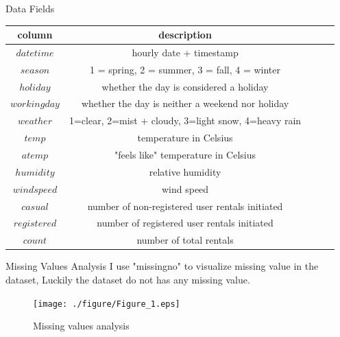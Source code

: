 \documentclass[
 size=14pt,
 paper=smartboard,  %
 mode=present, 		%
 display=slides, 	%
 style=tuliplab,  	%
 pauseslide,
 fleqn,leqno]{powerdot}
\begin{document}
\begin{slide}{Data Fields}
\begin{center}
	\begin{tabular}{c| c c c c }
		\toprule
		\textbf{column} & \textbf{description}  \\
		\midrule
		$datetime$ &  {hourly date + timestamp }\\
		$season$ &  {1 = spring, 2 = summer, 3 = fall, 4 = winter} \\
		$holiday$ &  {whether the day is considered a holiday} \\
		$workingday$ &  {whether the day is neither a weekend nor holiday} \\
		$weather$ &  {1=clear, 2=mist + cloudy, 3=light snow, 4=heavy rain} \\
		$temp$ & {temperature in Celsius} \\
		$atemp$ & {"feels like" temperature in Celsius} \\
		$humidity$ & {relative humidity} \\
		$windspeed$ & {wind speed} \\
		$casual$ & {number of non-registered user rentals initiated} \\
		$registered$ & {number of registered user rentals initiated} \\
		$count$ & {number of total rentals} \\
		\bottomrule
	\end{tabular}
\end{center}
\end{slide}

\begin{slide}{Missing Values Analysis}
I use "missingno" to visualize missing value in the dataset, Luckily the dataset do not has any missing value.
\begin{figure}[htbp]
	\texttt{[image: ./figure/Figure\_1.eps]}
	\caption{Missing values analysis}
\end{figure}
\end{slide}
\end{document}
